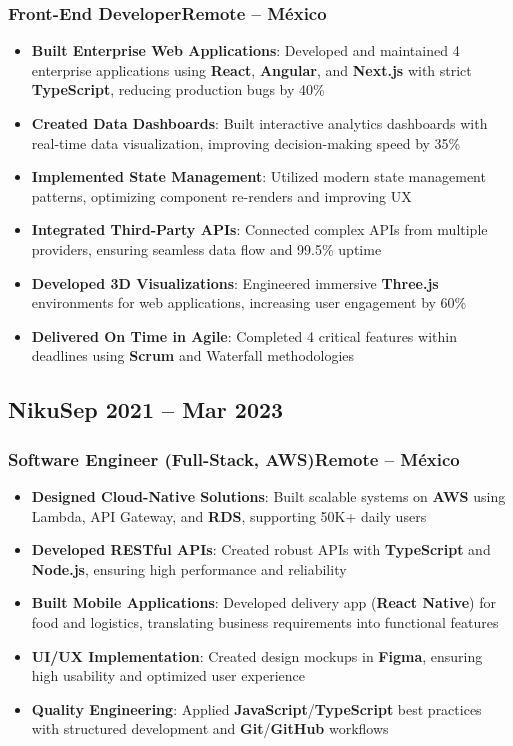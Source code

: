 \documentclass[a4paper,10pt]{article}
\newcommand{\kw}[1]{\textbf{\textcolor{keyword}{#1}}}
\newcommand{\tech}[1]{\textbf{\textcolor{tech}{#1}}}
\begin{document}
\subsubsection*{Front-End Developer\hfill Remote -- México}
\begin{itemize}[noitemsep, leftmargin=*]
    \item \textbf{Built Enterprise Web Applications}: Developed and maintained 4 enterprise applications using \tech{React}, \tech{Angular}, and \tech{Next.js} with strict \tech{TypeScript}, reducing production bugs by 40\%
    \item \textbf{Created Data Dashboards}: Built interactive analytics dashboards with real-time data visualization, improving decision-making speed by 35\%
    \item \textbf{Implemented State Management}: Utilized modern state management patterns, optimizing component re-renders and improving UX
    \item \textbf{Integrated Third-Party APIs}: Connected complex APIs from multiple providers, ensuring seamless data flow and 99.5\% uptime
    \item \textbf{Developed 3D Visualizations}: Engineered immersive \tech{Three.js} environments for web applications, increasing user engagement by 60\%
    \item \textbf{Delivered On Time in Agile}: Completed 4 critical features within deadlines using \kw{Scrum} and Waterfall methodologies
\end{itemize}

\subsection*{Niku\hfill\textbf{Sep 2021 -- Mar 2023}}
\subsubsection*{Software Engineer (Full-Stack, AWS)\hfill Remote -- México}
\begin{itemize}[noitemsep, leftmargin=*]
    \item \textbf{Designed Cloud-Native Solutions}: Built scalable systems on \tech{AWS} using Lambda, API Gateway, and \tech{RDS}, supporting 50K+ daily users
    \item \textbf{Developed RESTful APIs}: Created robust APIs with \tech{TypeScript} and \tech{Node.js}, ensuring high performance and reliability
    \item \textbf{Built Mobile Applications}: Developed delivery app (\tech{React Native}) for food and logistics, translating business requirements into functional features
    \item \textbf{UI/UX Implementation}: Created design mockups in \tech{Figma}, ensuring high usability and optimized user experience
    \item \textbf{Quality Engineering}: Applied \tech{JavaScript}/\tech{TypeScript} best practices with structured development and \tech{Git}/\tech{GitHub} workflows
\end{itemize}
\end{document}
